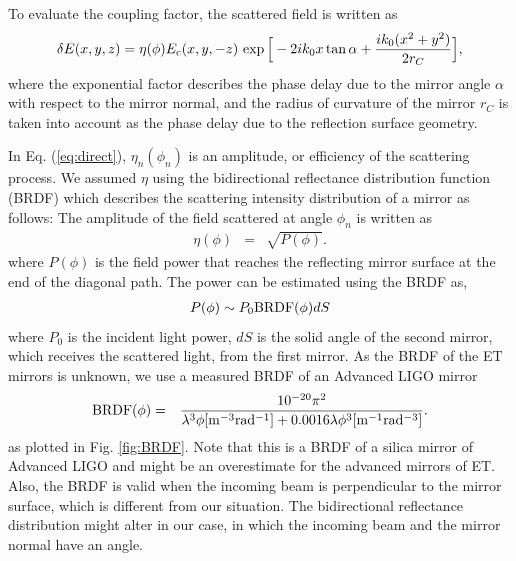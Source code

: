 To evaluate the coupling factor, the scattered field is written as
%
\begin{eqnarray}
\label{eq:direct}
\delta E (x,y,z) = \eta(\phi) E _{\rm c}(x,y,-z) \,
\exp  \Big[ -2ik_0 x \tan \alpha +\frac{i k_0 (x^2+y^2)}{2 r_C} \Bigr],
\end{eqnarray}
where the exponential factor describes the phase delay due to the mirror angle $\alpha$
with respect to the mirror normal,
and the radius of curvature of the mirror $r_C$
is taken into account as the phase delay due to the reflection surface geometry.

In Eq. (\ref{eq:direct}),
$\eta _n (\phi _{n})$ is an amplitude, or efficiency of the scattering process.
We assumed $\eta$ using the bidirectional reflectance distribution
function (BRDF) which
describes the scattering intensity distribution of a mirror as follows:
The amplitude of the field scattered at angle $\phi _n$ is written as
\begin{eqnarray}
\eta (\phi )&=&\sqrt{P(\phi )}.
\end{eqnarray}
where $P(\phi )$ is the field power that reaches the reflecting mirror surface
at the end of the diagonal path.
The power can be estimated using the BRDF as,
\begin{eqnarray}
P(\phi ) \sim P_0 {\rm BRDF}(\phi ) dS
\end{eqnarray}
where $P_0$ is the incident light power,
$dS$ is the solid angle of the second mirror, which receives the scattered light,
from the first mirror.
As the BRDF of the ET mirrors is unknown,
we use a measured BRDF of an Advanced LIGO mirror~\cite{Yamamoto2011}
\begin{eqnarray}
{\rm BRDF}(\phi )&=&\frac{10^{-20} \pi ^2}{\lambda ^3 \phi {[\rm m^{-3}rad^{-1}]} +0.0016 \lambda \phi ^3 {[\rm m^{-1}rad^{-3}]}}.
\end{eqnarray}
as plotted in Fig. \ref{fig:BRDF}.
Note that this is a BRDF of a silica mirror of Advanced LIGO
and might be an overestimate for the advanced mirrors of ET.
Also, the BRDF is valid when the incoming beam is perpendicular
to the mirror surface, which is different from our situation.
The bidirectional reflectance distribution might alter in our case, in which
the incoming beam and the mirror normal have an angle.

